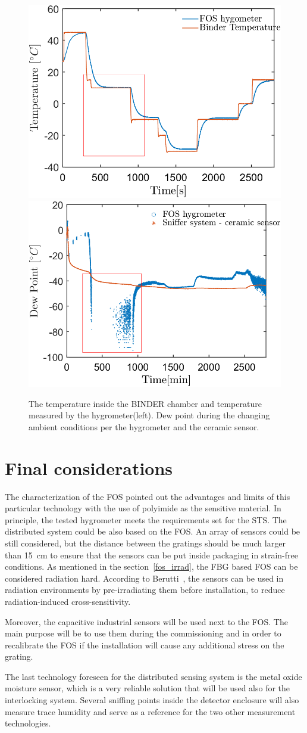 \begin{figure}[!h]
\centering
\includegraphics[width=0.47\columnwidth]{Chapter5/images/FOS_performance_T.png}
\includegraphics[width=0.47\columnwidth]{Chapter5/images/FOS_performance1.png}
\caption{The temperature inside the BINDER chamber and temperature measured by the hygrometer(left). Dew point during the changing ambient conditions per the hygrometer and the ceramic sensor.}
\label{Tfig_comparison_2}
\end{figure}
\section{Final considerations}
The characterization of the \gls{FOS} pointed out the advantages and limits of this particular technology with the use of polyimide as the sensitive material. In principle, the tested hygrometer meets the requirements set for the \gls{STS}. The distributed system could be also based on the \gls{FOS}. An array of sensors could be still considered, but the distance between the gratings should be much larger than \SI{15}{\cm} to ensure that the sensors can be put inside packaging in strain-free conditions. As mentioned in the section~\ref{fos_irrad}, the \gls{FBG} based \gls{FOS} can be considered radiation hard. According to Berutti~\cite{Berruti}, the sensors can be used in radiation environments by pre-irradiating them before installation, to reduce radiation-induced cross-sensitivity. 

Moreover, the capacitive industrial sensors will be used next to the \gls{FOS}. The main purpose will be to use them during the commissioning and in order to recalibrate the \gls{FOS} if the installation will cause any additional stress on the grating.

The last technology foreseen for the distributed sensing system is the metal oxide moisture sensor, which is a very reliable solution that will be used also for the interlocking system.  Several sniffing points inside the detector enclosure will also measure trace humidity and serve as a reference for the two other measurement technologies.